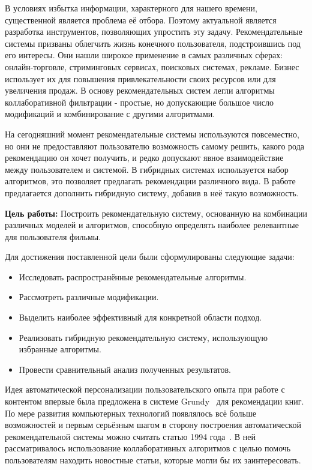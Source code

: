\documentclass[a4paper,article,14pt]{extarticle}
\begin{document}


\tableofcontents

\pagebreak
{}

В условиях избытка информации, характерного для нашего времени, существенной является проблема её отбора.
Поэтому актуальной является разработка инструментов, позволяющих упростить эту задачу.
Рекомендательные системы призваны облегчить жизнь конечного пользователя, подстроившись под его интересы.
Они нашли широкое применение в самых различных сферах: онлайн-торговле, стриминговых сервисах, поисковых системах, рекламе.
Бизнес использует их для повышения привлекательности своих ресурсов или для увеличения продаж.
В основу рекомендательных систем легли алгоритмы коллаборативной фильтрации - простые, но допускающие большое число модификаций и комбинирование с другими алгоритмами.

На сегодняшний момент рекомендательные системы используются повсеместно, но они не предоставляют пользователю возможность самому решить, какого рода рекомендацию он хочет получить, и редко допускают явное взаимодействие между пользователем и системой.
В гибридных системах используется набор алгоритмов, это позволяет предлагать рекомендации различного вида.
В работе предлагается дополнить гибридную систему, добавив в неё такую возможность.

\pagebreak
{}
\textbf{Цель работы:} Построить рекомендательную систему, основанную на комбинации различных моделей и алгоритмов, способную определять наиболее релевантные для пользователя фильмы.

Для достижения поставленной цели были сформулированы следующие задачи:
\begin{itemize}
\item Исследовать распространённые рекомендательные алгоритмы.
\item Рассмотреть различные модификации.
\item Выделить наиболее эффективный для конкретной области подход.
\item Реализовать гибридную рекомендательную систему, использующую избранные алгоритмы.
\item Провести сравнительный анализ полученных результатов.
\end{itemize}

\pagebreak
{}
Идея автоматической персонализации пользовательского опыта при работе с контентом впервые была предложена в системе Grundy~\cite{rich} для рекомендации книг.
По мере развития компьютерных технологий появлялось всё больше возможностей и первым серьёзным шагом в сторону построения автоматической рекомендательной системы можно считать статью 1994 года~\cite{resnick}.
В ней рассматривалось использование коллаборативных алгоритмов с целью помочь пользователям находить новостные статьи, которые могли бы их заинтересовать.
\end{document}

